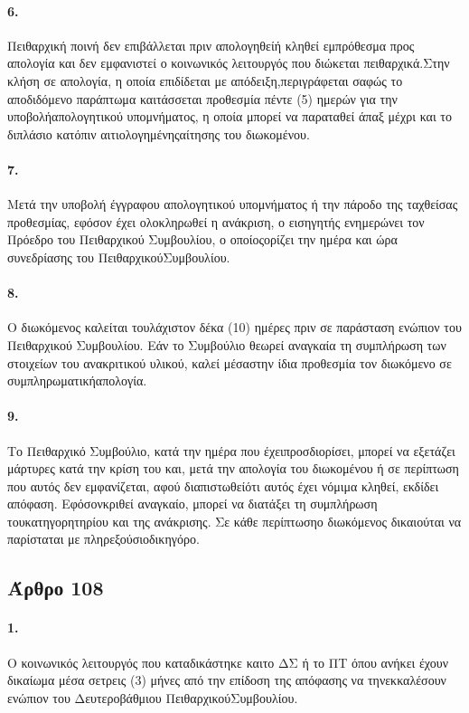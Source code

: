 \documentclass[a4paper,oneside, 10pt]{book}
\begin{document}
\paragraph { 6. } Πειθαρχική ποινή δεν επιβάλλεται πριν απολογηθείή κληθεί εμπρόθεσμα προς απολογία και δεν εμφανιστεί ο κοινωνικός λειτουργός που διώκεται πειθαρχικά.Στην κλήση σε απολογία, η οποία επιδίδεται με απόδειξη,περιγράφεται σαφώς το αποδιδόμενο παράπτωμα καιτάσσεται προθεσμία πέντε (5) ημερών για την υποβολήαπολογητικού υπομνήματος, η οποία μπορεί να παραταθεί άπαξ μέχρι και το διπλάσιο κατόπιν αιτιολογημένηςαίτησης του διωκομένου.
\paragraph { 7. } Μετά την υποβολή έγγραφου απολογητικού υπομνήματος ή την πάροδο της ταχθείσας προθεσμίας, εφόσον έχει ολοκληρωθεί η ανάκριση, ο εισηγητής ενημερώνει τον Πρόεδρο του Πειθαρχικού Συμβουλίου, ο οποίοςορίζει την ημέρα και ώρα συνεδρίασης του ΠειθαρχικούΣυμβουλίου.
\paragraph { 8. } Ο διωκόμενος καλείται τουλάχιστον δέκα (10) ημέρες πριν σε παράσταση ενώπιον του Πειθαρχικού Συμβουλίου. Εάν το Συμβούλιο θεωρεί αναγκαία τη συμπλήρωση των στοιχείων του ανακριτικού υλικού, καλεί μέσαστην ίδια προθεσμία τον διωκόμενο σε συμπληρωματικήαπολογία.
\paragraph { 9. } Το Πειθαρχικό Συμβούλιο, κατά την ημέρα που έχειπροσδιορίσει, μπορεί να εξετάζει μάρτυρες κατά την κρίση του και, μετά την απολογία του διωκομένου ή σε περίπτωση που αυτός δεν εμφανίζεται, αφού διαπιστωθείότι αυτός έχει νόμιμα κληθεί, εκδίδει απόφαση. Εφόσονκριθεί αναγκαίο, μπορεί να διατάξει τη συμπλήρωση τουκατηγορητηρίου και της ανάκρισης. Σε κάθε περίπτωσηο διωκόμενος δικαιούται να παρίσταται με πληρεξούσιοδικηγόρο.
\subsection*{ Άρθρο 108 }
\paragraph { 1. } Ο κοινωνικός λειτουργός που καταδικάστηκε καιτο ΔΣ ή το ΠΤ όπου ανήκει έχουν δικαίωμα μέσα σετρεις (3) μήνες από την επίδοση της απόφασης να τηνεκκαλέσουν ενώπιον του Δευτεροβάθμιου ΠειθαρχικούΣυμβουλίου.
\end{document}
